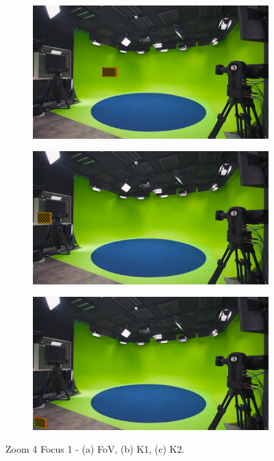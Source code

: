 \begin{figure}[h]
    \centering
    \begin{subfigure}[b]{0.45\textwidth}
        \includegraphics[width=\textwidth]{Images/08annex/results/7.2.png}
        \caption{}
        \label{fig:a2}
    \end{subfigure}
    \hfill
    \begin{subfigure}[b]{0.45\textwidth}
        \includegraphics[width=\textwidth]{Images/08annex/results/7.3.png}
        \caption{}
        \label{fig:b2}
    \end{subfigure}
    
    \vspace{0.5cm}
    
    \begin{subfigure}[b]{0.45\textwidth}
        \includegraphics[width=\textwidth]{Images/08annex/results/7.4.png}
        \caption{}
        \label{fig:c2}
    \end{subfigure}

    \caption{Zoom 4 Focus 1 - (a) FoV, (b) K1, (c) K2.}
    \label{fig:vir_fov_cal}
\end{figure}

